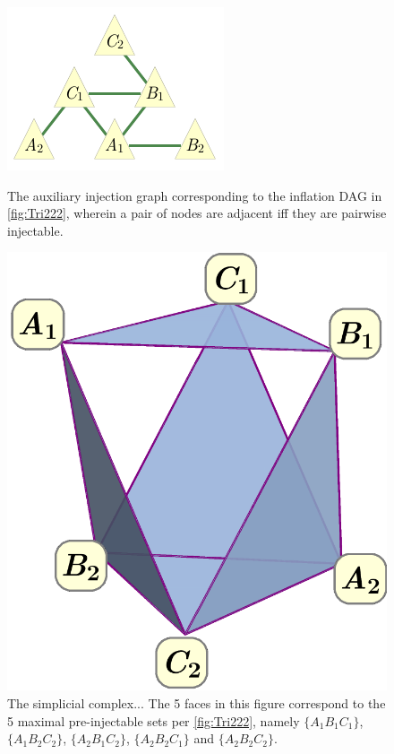 \begin{figure}[t]
\centering
\begin{minipage}[b]{0.4\linewidth}
\centering
\includegraphics[scale=1]{injectiongraph222.pdf}
\caption{The auxiliary injection graph corresponding to the inflation DAG in \cref{fig:Tri222}, wherein a pair of nodes are adjacent iff they are pairwise injectable.}\label{fig:injection222}
\end{minipage}
\hfill
\begin{minipage}[b]{0.5\linewidth}
\centering
\includegraphics[scale=0.25]{simplicialcomplex.pdf}
\caption{The simplicial complex... The 5 faces in this figure correspond to the 5 maximal pre-injectable sets per \cref{fig:Tri222}, namely $\{A_1 B_1 C_1\}$, $\{A_1 B_2 C_2\}$, $\{A_2 B_1 C_2\}$, $\{A_2 B_2 C_1\}$ and $\{A_2 B_2 C_2\}$.}\label{fig:simplicialcomplex222}
\end{minipage}
\end{figure}

